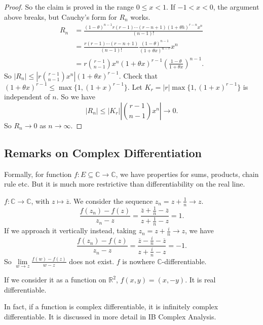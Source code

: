 \begin{example}
\begin{proof}
        So the claim is proved in the range \( 0 \leq x < 1\). If \(-1 < x <0\), the argument above breaks, but Cauchy's form for \(R_n\) works.
        \begin{align*}
            R_n &= \frac{(1-\theta)^{n-1}r(r-1)\cdots(r-n+1)(1+\theta h)^{r-n}x^n}{(n-1)!}\\
            &= \frac{r(r-1) \cdots (r-n+1)}{(n-1)!}\frac{(1-\theta)^{n-1}}{(1+\theta x)^{n-r}}x^n\\
            &= r \binom{r-1}{n-1}x^n (1+\theta x)^{r-1} (\frac{1 - \theta}{1+\theta x})^{n-1}.
        \end{align*}
        So \(\left\vert R_n \right\vert \leq \left\vert r \binom{r-1}{n-1}x^n \right\vert (1 + \theta x)^{r-1}\). Check that \((1 + \theta x)^{r-1} \leq \mathop{\max}\{1, (1+x)^{r-1}\}\). Let \(K_r = \left\vert r \right\vert \mathop{\max} \{1, (1+x)^{r-1}\}\) is independent of \(n\). So we have
        \[
            \left\vert R_n \right\vert \leq \left\vert K_r \right\vert \left\vert \binom{r-1}{n-1}x^n \right\vert \to 0.
        \]
        So \(R_n \to 0\) as \(n \to \infty\).
    \end{proof}
\end{example}
\subsection{Remarks on Complex Differentiation}
Formally, for function \(f: E \subseteq \mathbb{C} \to \mathbb{C}\), we have properties for sums, products, chain rule etc. But it is much more restrictive than differentiability on the real line.
\begin{example}
    \(f: \mathbb{C} \to \mathbb{C}\), with \(z \mapsto \overline{z}\). We consider the sequence \(z_n = z + \frac{1}{n} \to z\).
    \[
        \frac{f(z_n) - f(z)}{z_{n}-z} = \frac{\overline{z}+\frac{1}{n}-\overline{z}}{z + \frac{1}{n}-z} = 1.
    \]
    If we approach it vertically instead, taking \(z_n = z + \frac{i}{n}\to z\), we have
    \[
        \frac{f(z_n)-f(z)}{z_n - z} = \frac{\overline{z} - \frac{i}{n}-\overline{z}}{z + \frac{i}{n}-z} = -1.
    \]
    So \(\lim\limits_{w \to z} \frac{f(w)-f(z)}{w-z}\) does not exist. \(f\) is nowhere \(\mathbb{C}\)-differentiable.

    If we consider it as a function on \(\mathbb{R}^2\), \(f(x,y)=(x,-y)\). It is real differentiable.

    In fact, if a function is complex differentiable, it is infinitely complex differentiable. It is discussed in more detail in IB Complex Analysis.
\end{example}